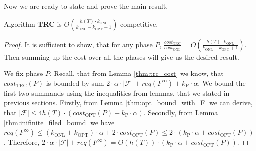 Now we are ready to state and prove the main result.  \begin{theorem} Algorithm
\textbf{TRC} is $O(\frac{h(T) \cdot k_{\mathrm{ONL}}}{k_{\mathrm{ONL}} -
k_{\mathrm{OPT}} + 1})$-competitive.  \label{thm:main_theorem} \end{theorem}
\begin{proof} It is sufficient to show, that for any phase $P$,
$\frac{cost_{\mathrm{TRC}}}{cost_{\mathrm{ONL}}} = O(\frac{h(T) \cdot
k_{\mathrm{ONL}}}{k_{\mathrm{ONL}} - k_{\mathrm{OPT}} + 1})$. Then summing up
the cost over all the phases will give us the desired result.

We fix phase $P$. Recall, that from Lemma \ref{thm:trc_cost} we know, that
$cost_{\mathrm{TRC}}(P)$ is bounded by sum $2 \cdot \alpha \cdot |\mathcal{F}| +
req(F^{\infty}) + k_{\mathrm{P}} \cdot \alpha$. We bound the first two summands using the
inequalities from lemmas, that we stated in previous sections. Firstly, from
Lemma \ref{thm:opt_bound_with_F} we can derive, that $|\mathcal{F}| \leq 4h(T)
\cdot (cost_{\mathrm{OPT}}(P) + k_{\mathrm{P}} \cdot \alpha)$. Secondly, from Lemma
\ref{thm:inifinite_filed_bound} we have $req(F^{\infty}) \leq (k_{\mathrm{ONL}}
+ k_{\mathrm{OPT}}) \cdot \alpha + 2 \cdot cost_{\mathrm{OPT}}(P) \leq 2 \cdot
(k_{\mathrm{P}} \cdot \alpha + cost_{\mathrm{OPT}}(P))$. Therefore, $2 \cdot \alpha \cdot
|\mathcal{F}| + req(F^{\infty}) = O(h(T)) \cdot (k_{\mathrm{P}} \cdot \alpha +
cost_{\mathrm{OPT}}(P))$.  \end{proof}

